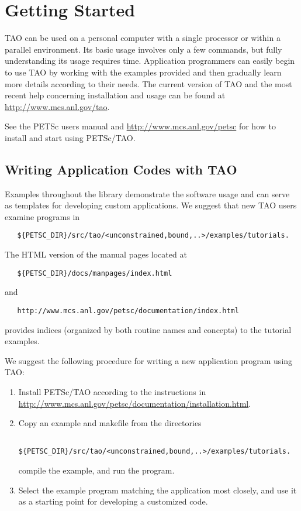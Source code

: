 \chapter{Getting Started}
\label{chapter:intro_tao}

TAO can be used on a personal
computer with a single processor or within a parallel environment.  
Its basic usage involves only a few commands, but fully 
understanding its usage requires time.
Application programmers can easily begin to use TAO by working with 
the examples provided and then gradually learn more details according to
their needs.  The current version of TAO and the most recent help 
concerning installation and usage can be found at  
\url{http://www.mcs.anl.gov/tao}.

See the PETSc users manual and \url{http://www.mcs.anl.gov/petsc} for how to install and start using PETSc/TAO.

\section{Writing Application Codes with TAO}

Examples throughout the library demonstrate the software usage and
can serve as templates for developing custom applications.  We suggest
that new TAO users examine programs in
\begin{verbatim}
   ${PETSC_DIR}/src/tao/<unconstrained,bound,..>/examples/tutorials.
\end{verbatim} 
The HTML version of the manual pages located at
\begin{verbatim}
   ${PETSC_DIR}/docs/manpages/index.html
\end{verbatim} %
\noindent
and
\begin{verbatim}
   http://www.mcs.anl.gov/petsc/documentation/index.html
\end{verbatim}
\noindent
provides indices (organized by both routine names and concepts) to the
tutorial examples.

We suggest the following procedure for writing a new application
program using TAO:

\begin{enumerate}
\item Install PETSc/TAO according to the instructions in
  \url{http://www.mcs.anl.gov/petsc/documentation/installation.html}.
\item Copy an example and makefile from the directories
\begin{verbatim}
   ${PETSC_DIR}/src/tao/<unconstrained,bound,..>/examples/tutorials.
\end{verbatim} 
  compile the example, and run the program. 
\item Select the example program matching the application most
  closely, and use it as a starting point for developing a customized
  code.
\end{enumerate}

